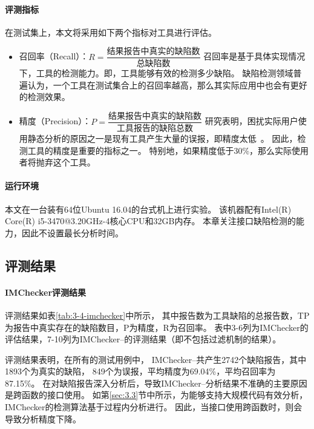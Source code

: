\paragraph{评测指标}
在测试集上，本文将采用如下两个指标对工具进行评估。
\begin{itemize}
	\item 召回率（Recall）：$R = \dfrac{\text{结果报告中真实的缺陷数}}{\text{总缺陷数}}$
	召回率是基于具体实现情况下，工具的检测能力。即，工具能够有效的检测多少缺陷。
	缺陷检测领域普遍认为，一个工具在测试集合上的召回率越高，那么其实际应用中也会有更好的检测效果。
	\item 精度（Precision）：$P = \dfrac{\text{结果报告中真实的缺陷数}}{\text{工具报告的缺陷总数}}$
	研究表明，困扰实际用户使用静态分析的原因之一是现有工具产生大量的误报，即精度太低~\cite{10-acm-precision}。
	因此，检测工具的精度是重要的指标之一。
	特别地，如果精度低于30\%，那么实际使用者将抛弃这个工具。
\end{itemize}

\paragraph{运行环境} 本文在一台装有64位Ubuntu 16.04的台式机上进行实验。
该机器配有Intel(R) Core(R) i5-3470@3.20GHz-4核心CPU和32GB内存。
本章关注接口缺陷检测的能力，因此不设置最长分析时间。


\subsection{评测结果}


\paragraph{IMChecker评测结果}
评测结果如表\ref{tab:3-4-imchecker}中所示，
其中报告数为工具缺陷的总报告数，TP为报告中真实存在的缺陷数目，P为精度，R为召回率。
表中3-6列为IMChecker的评估结果，7-10列为IMChecker--的评测结果（即不包括过滤机制的结果）。

评测结果表明，在所有的测试用例中，
IMChecker--共产生2742个缺陷报告，其中1893个为真实的缺陷，
849个为误报，平均精度为69.04\%，平均召回率为87.15\%。
在对缺陷报告深入分析后，导致IMChecker--分析结果不准确的主要原因是跨函数的接口使用。
如第\ref{sec:3.3}节中所示，为能够支持大规模代码有效分析，IMChecker的检测算法基于过程内分析进行。
因此，当接口使用跨函数时，则会导致分析精度下降。

